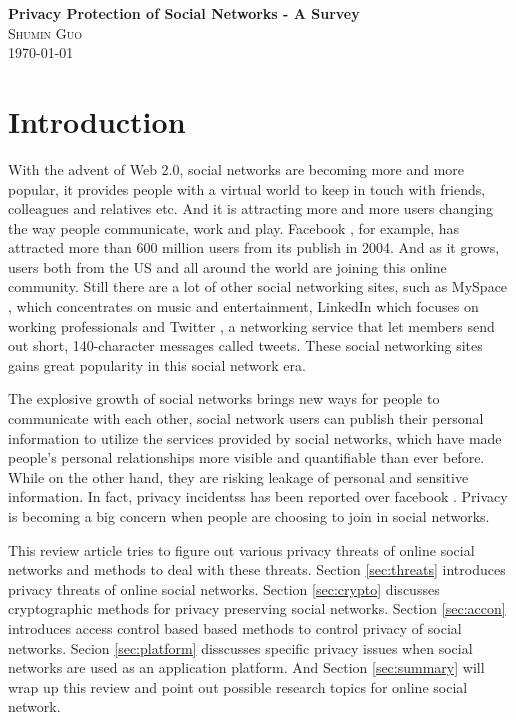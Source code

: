 \documentclass[12pt]{article}
\begin{document}
\begin{center}                  %
\textbf{\Large{Privacy Protection of Social Networks - A Survey}} \\ 
\small\textsc{Shumin Guo} \\
\today
\end{center}

\section{Introduction}
With the advent of Web 2.0, social networks are becoming more and more
popular, it provides people with a virtual world to keep in touch with
friends, colleagues and relatives etc. And it is attracting more and
more users changing the way people communicate, work and
play. Facebook \cite{poke-facebook}, for example, has attracted more
than 600 million users \cite{facebooksite} from its publish in
2004. And as it grows, users both from the US and all around the
world are joining this online community. Still there are a lot of
other social networking sites, such as MySpace \cite{myspacesite},
which concentrates on music and entertainment, LinkedIn which focuses
on working professionals and Twitter \cite{twittersite}, a networking
service that let members send out short, 140-character messages called
tweets. These social networking sites gains great popularity in this
social network era.

The explosive growth of social networks brings new ways for people to
communicate with each other, social network users can publish their
personal information to utilize the services provided by social
networks, which have made people's personal relationships more visible
and quantifiable than ever before.  While on the other hand, they are
risking leakage of personal and sensitive information. In fact,
privacy incidentss has been reported over facebook
\cite{social-networking-report-economist}. Privacy is becoming a 
big concern when people are choosing to join in social networks.

This review article tries to figure out various privacy threats of
online social networks and methods to deal with these threats. Section
\ref{sec:threats} introduces privacy threats of online social
networks. Section \ref{sec:crypto} discusses cryptographic methods for
privacy preserving social networks. Section \ref{sec:accon}
introduces access control based based methods to control privacy of
social networks. Secion \ref{sec:platform} disscusses specific
privacy issues when social networks are used as an application
platform. And Section \ref{sec:summary} will wrap up this review and
point out possible research topics for online social network.
\end{document}

